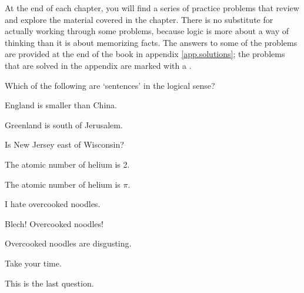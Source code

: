 


\iffalse %

\practiceproblems
At the end of each chapter, you will find a series of practice problems that review and explore the material covered in the chapter. There is no substitute for actually working through some problems, because logic is more about a way of thinking than it is about memorizing facts. The answers to some of the problems are provided at the end of the book in appendix \ref{app.solutions}; the problems that are solved in the appendix are marked with a \solutions.

\solutions
\problempart
\label{pr.Sentences1}
Which of the following are `sentences' in the logical sense?
\begin{earg}
\item England is smaller than China.
\item Greenland is south of Jerusalem.
\item Is New Jersey east of Wisconsin?
\item The atomic number of helium is 2.
\item The atomic number of helium is $\pi$.
\item I hate overcooked noodles.
\item Blech! Overcooked noodles!
\item Overcooked noodles are disgusting.
\item Take your time.
\item This is the last question.
\end{earg}

